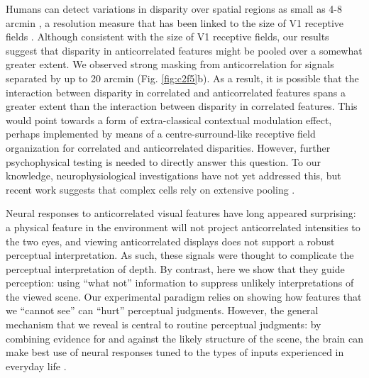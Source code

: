 Humans can detect variations in disparity over spatial regions as small as 4-8 arcmin \cite{Harris:1997kx,Banks:2004oh}, a resolution measure that has been linked to the size of V1 receptive fields \cite{Nienborg:2004ra}. Although consistent with the size of V1 receptive fields, our results suggest that disparity in anticorrelated features might be pooled over a somewhat greater extent. We observed strong masking from anticorrelation for signals separated by up to 20 arcmin (Fig. \ref{fig:c2f5}b). As a result, it is possible that the interaction between disparity in correlated and anticorrelated features spans a greater extent than the interaction between disparity in correlated features. This would point towards a form of extra-classical contextual modulation effect, perhaps implemented by means of a centre-surround-like receptive field organization for correlated and anticorrelated disparities. However, further psychophysical testing is needed to directly answer this question. To our knowledge, neurophysiological investigations have not yet addressed this, but recent work suggests that complex cells rely on extensive pooling \cite{Sasaki:2010pi,Kato:2016fk}.

Neural responses to anticorrelated visual features have long appeared surprising: a physical feature in the environment will not project anticorrelated intensities to the two eyes, and viewing anticorrelated displays does not support a robust perceptual interpretation. As such, these signals were thought to complicate the perceptual interpretation of depth. By contrast, here we show that they guide perception: using ``what not'' information to suppress unlikely interpretations of the viewed scene\cite{Goncalves:2017aa}. Our experimental paradigm relies on showing how features that we ``cannot see'' can ``hurt'' perceptual judgments. However, the general mechanism that we reveal is central to routine perceptual judgments: by combining evidence for and against the likely structure of the scene, the brain can make best use of neural responses tuned to the types of inputs experienced in everyday life \cite{Goncalves:2017aa}.




